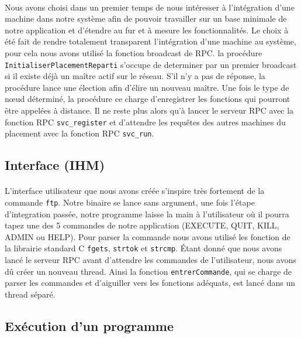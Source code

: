     \paragraph{}
    Nous avons choisi dans un premier temps de nous intéresser à
    l'intégration d'une machine dans notre système afin de pouvoir
    travailler sur un base minimale de notre application et d'étendre au
    fur et à mesure les fonctionnalités. Le choix à été fait de rendre
    totalement transparent l'intégration d'une machine au système, pour
    cela nous avons utilisé la fonction broadcast de RPC. la procédure 
    \verb"InitialiserPlacementReparti" s'occupe de determiner par un premier
    broadcast si il existe déjà un maître actif sur le réseau. S'il n'y
    a pas de réponse, la procédure lance une élection afin d'élire un
    nouveau maître.
    Une fois le type de n\oe{}ud déterminé, la procédure ce charge
    d'enregistrer les fonctions qui pourront être appelées à distance.
    Il ne reste plus alors qu'à lancer le serveur RPC avec la fonction RPC
    \verb"svc_register" et d'attendre les requêtes des autres machines du placement 
    avec la fonction RPC \verb"svc_run". 
  
  \subsection{Interface (IHM)}
    \paragraph{}
    L'interface utilisateur que nous avons créée s'inspire très
    fortement de la commande \verb"ftp". Notre binaire se lance sans argument,
    une fois l'étape d'integration passée, notre programme laisse la 
    main à l'utilisateur où il pourra tapez une des 5 commandes de notre
    application (EXECUTE, QUIT, KILL, ADMIN ou HELP). Pour parser la
    commande nous avons utilisé les fonction de la librairie standard C
    \verb"fgets", \verb"strtok" et \verb"strcmp". 
    Étant donné que nous avons lancé le serveur RPC avant d'attendre les
    commandes de l'utilisateur, nous avons dû créer un nouveau thread.
    Ainsi la fonction \verb"entrerCommande", qui se charge de parser les 
    commandes et d'aiguiller vers les fonctions adéquats, est lancé dans
    un thread séparé.
  
  \subsection{Exécution d'un programme}
